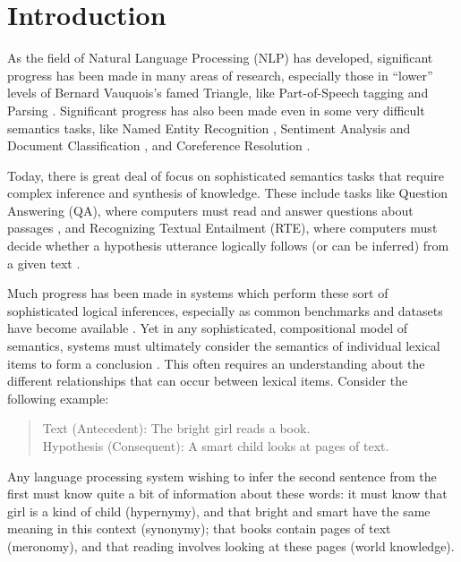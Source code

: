 \documentclass[12pt]{article}
\begin{document}
\tableofcontents
\pagebreak

\section{Introduction}
\label{sec:intro}

As the field of Natural Language Processing (NLP) has developed, significant
progress has been made in many areas of research, especially those in ``lower''
levels of Bernard Vauquois's famed Triangle, like Part-of-Speech tagging
\cite{toutanova:2003:naacl} and Parsing \cite{chen:2014:emnlp}.  Significant progress
has also been made even in some very difficult semantics tasks,
like Named Entity Recognition \cite{NEEDCITE}, Sentiment Analysis
\cite{socher:2013:nips} and Document Classification \cite{zhang:2016:naacl},
and Coreference Resolution \cite{durrett:2013:emnlp}.

Today, there is great deal of focus on sophisticated semantics tasks that
require complex inference and synthesis of knowledge. These include tasks like
Question Answering (QA), where computers must read and answer questions about
passages \cite{hermann:2015:nips,weston:2016:iclr}, and Recognizing Textual
Entailment (RTE), where computers must decide whether a hypothesis utterance
logically follows (or can be inferred) from a given text
\cite{dagan:2006:mlc,marelli:2014:semeval,bowman:2015:emnlp}.

Much progress has been made in systems which perform these sort of
sophisticated logical inferences, especially as common benchmarks and datasets
have become available
\cite{dagan:2006:mlc,giampiccolo:2007:pascal,bentivogli:2009:tac,marelli:2014:semeval,bowman:2015:emnlp}.
Yet in any sophisticated, compositional model of semantics, systems must
ultimately consider the semantics of individual lexical items to form a
conclusion \cite{montague:1970:theoria,kamp:2013:discourse}.  This often
requires an understanding about the different relationships that can occur
between lexical items. Consider the following example:
\begin{quote}
  Text (Antecedent): The bright girl reads a book.\\
  Hypothesis (Consequent): A smart child looks at pages of text.
\end{quote}
Any language processing system wishing to infer the second sentence from the
first must know quite a bit of information about these words: it must know that
girl is a kind of child (hypernymy), and that bright and smart have the same
meaning in this context (synonymy); that books contain pages of text
(meronomy), and that reading involves looking at these pages (world knowledge).
\end{document}
